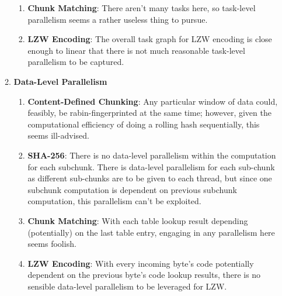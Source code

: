 \documentclass{article}
\begin{document}
\begin{enumerate}
\begin{enumerate}[label=(\alph*)]
\begin{enumerate}[label=(\roman*)]
\item%
\textbf{Chunk Matching}:\newline
There aren't many tasks here, so task-level parallelism seems a rather useless thing to pursue.

\item%
\textbf{LZW Encoding}:\newline
The overall task graph for LZW encoding is close enough to linear that there is not much reasonable task-level parallelism to be captured.

\end{enumerate}%

\item%
\textbf{Data-Level Parallelism}
\begin{enumerate}[label=(\roman*)]
\item%
\textbf{Content-Defined Chunking}:\newline
Any particular window of data could, feasibly, be rabin-fingerprinted at the same time; however, given the computational efficiency of doing a rolling hash sequentially, this seems ill-advised.
\item%
\textbf{SHA-256}:\newline
There is no data-level parallelism within the computation for each subchunk. There is data-level parallelism for each sub-chunk as different sub-chunks are to be given to each thread, but since 
one subchunk computation is dependent on previous subchunk computation, this parallelism can't be exploited.
\item%
\textbf{Chunk Matching}:\newline
With each table lookup result depending (potentially) on the last table entry, engaging in any parallelism here seems foolish.

\item%
\textbf{LZW Encoding}:\newline
With every incoming byte's code potentially dependent on the previous byte's code lookup results, there is no sensible data-level parallelism to be leveraged for LZW.

\end{enumerate}%


\end{enumerate}
\end{enumerate}
\end{document}
